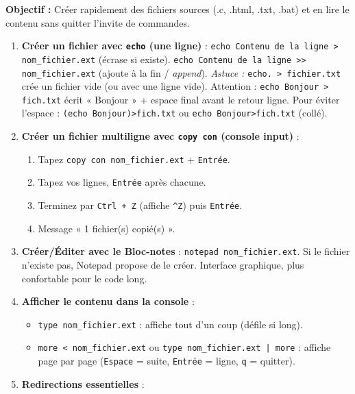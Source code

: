 \documentclass[11pt]{article}
\begin{document}
\begin{methode}
\textbf{Objectif :} Créer rapidement des fichiers sources (.c, .html, .txt, .bat) et en lire le contenu sans quitter l'invite de commandes.

\begin{enumerate}
    \item \textbf{Créer un fichier avec \texttt{echo} (une ligne)} :
    \texttt{echo Contenu de la ligne > nom\_fichier.ext} (écrase si existe).
    \texttt{echo Contenu de la ligne >> nom\_fichier.ext} (ajoute à la fin / \textit{append}).
    \textit{Astuce :} \texttt{echo. > fichier.txt} crée un fichier vide (ou avec une ligne vide). Attention : \texttt{echo Bonjour > fich.txt} écrit « Bonjour » + espace final avant le retour ligne. Pour éviter l'espace : \texttt{(echo Bonjour)>fich.txt} ou \texttt{echo Bonjour>fich.txt} (collé).
    \item \textbf{Créer un fichier multiligne avec \texttt{copy con} (console input)} :
    \begin{enumerate}
        \item Tapez \texttt{copy con nom\_fichier.ext} + \texttt{Entrée}.
        \item Tapez vos lignes, \texttt{Entrée} après chacune.
        \item Terminez par \texttt{Ctrl + Z} (affiche \texttt{\textasciicircum{}Z}) puis \texttt{Entrée}.
        \item Message « 1 fichier(s) copié(s) ».
    \end{enumerate}
    \item \textbf{Créer/Éditer avec le Bloc-notes} : \texttt{notepad nom\_fichier.ext}. Si le fichier n'existe pas, Notepad propose de le créer. Interface graphique, plus confortable pour le code long.
    \item \textbf{Afficher le contenu dans la console} :
    \begin{itemize}
        \item \texttt{type nom\_fichier.ext} : affiche tout d'un coup (défile si long).
        \item \texttt{more < nom\_fichier.ext} ou \texttt{type nom\_fichier.ext | more} : affiche page par page (\texttt{Espace} = suite, \texttt{Entrée} = ligne, \texttt{q} = quitter).
    \end{itemize}
    \item \textbf{Redirections essentielles} :
    \begin{itemize}

\end{itemize}
\end{enumerate}
\end{methode}
\end{document}
